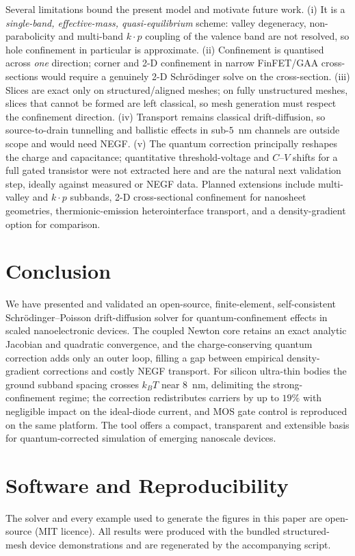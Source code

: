 \documentclass[conference]{IEEEtran}
\begin{document}
Several limitations bound the present model and motivate future work.
(i) It is a \emph{single-band, effective-mass, quasi-equilibrium} scheme: valley
degeneracy, non-parabolicity and multi-band $k\!\cdot\!p$ coupling of the valence
band are not resolved, so hole confinement in particular is approximate.
(ii) Confinement is quantised across \emph{one} direction; corner and 2-D
confinement in narrow FinFET/GAA cross-sections would require a genuinely 2-D
Schr\"odinger solve on the cross-section. (iii) Slices are exact only on
structured/aligned meshes; on fully unstructured meshes, slices that cannot be
formed are left classical, so mesh generation must respect the confinement
direction. (iv) Transport remains classical drift-diffusion, so source-to-drain
tunnelling and ballistic effects in sub-$5$~nm channels are outside scope and
would need NEGF. (v) The quantum correction principally reshapes the charge and
capacitance; quantitative threshold-voltage and $C$--$V$ shifts for a full gated
transistor were not extracted here and are the natural next validation step,
ideally against measured or NEGF data. Planned extensions include multi-valley and
$k\!\cdot\!p$ subbands, 2-D cross-sectional confinement for nanosheet geometries,
thermionic-emission heterointerface transport, and a density-gradient option for
comparison.

\section{Conclusion}
We have presented and validated an open-source, finite-element, self-consistent
Schr\"odinger--Poisson drift-diffusion solver for quantum-confinement effects in
scaled nanoelectronic devices. The coupled Newton core retains an exact analytic
Jacobian and quadratic convergence, and the charge-conserving quantum correction
adds only an outer loop, filling a gap between empirical density-gradient
corrections and costly NEGF transport. For silicon ultra-thin bodies the ground
subband spacing crosses $k_BT$ near $8$~nm, delimiting the strong-confinement
regime; the correction redistributes carriers by up to $19\%$ with negligible
impact on the ideal-diode current, and MOS gate control is reproduced on the same
platform. The tool offers a compact, transparent and extensible basis for
quantum-corrected simulation of emerging nanoscale devices.

\section*{Software and Reproducibility}
The solver and every example used to generate the figures in this paper are
open-source (MIT licence). All results were produced with the bundled
structured-mesh device demonstrations and are regenerated by the accompanying
script.
\end{document}
